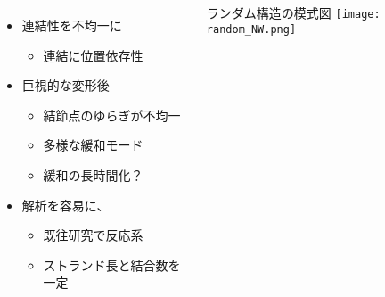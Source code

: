 \centering
\begin{columns}[totalwidth=.9\textwidth]
            \begin{itemize}
                \item 連結性を不均一に
                    \begin{itemize}
                        \item 連結に\alert{位置依存性}
                    \end{itemize}
                \item 巨視的な変形後
                    \begin{itemize}
                        \item 結節点のゆらぎが不均一
                        \item 多様な緩和モード
                        \item \alert{緩和の長時間化？}
                    \end{itemize}
                \item \alert{解析を容易}に、
                    \begin{itemize}
                        \item 既往研究で反応系
                        \item ストランド長と結合数を一定
                    \end{itemize}
            \end{itemize}
        ランダム構造の模式図
        \vspace{10mm}
        \texttt{[image: random\_NW.png]}
\end{columns}